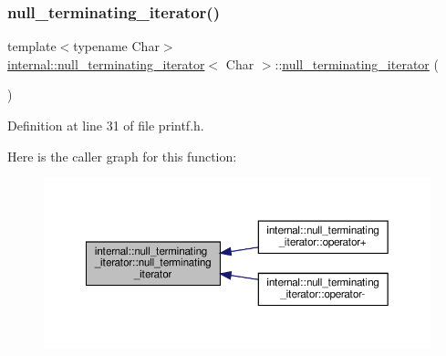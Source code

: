 \subsubsection{\texorpdfstring{null\+\_\+terminating\+\_\+iterator()}{null\_terminating\_iterator()}\hspace{0.1cm}{\footnotesize\ttfamily [1/3]}}
{\footnotesize\ttfamily template$<$typename Char$>$ \\
\hyperlink{classinternal_1_1null__terminating__iterator}{internal\+::null\+\_\+terminating\+\_\+iterator}$<$ Char $>$\+::\hyperlink{classinternal_1_1null__terminating__iterator}{null\+\_\+terminating\+\_\+iterator} (\begin{DoxyParamCaption}{ }\end{DoxyParamCaption})\hspace{0.3cm}{\ttfamily [inline]}}



Definition at line 31 of file printf.\+h.

Here is the caller graph for this function\+:
\nopagebreak
\begin{figure}[H]
\begin{center}
\leavevmode
\includegraphics[width=350pt]{classinternal_1_1null__terminating__iterator_a2c85bbc62dfa178fbe579df6933a70c4_icgraph}
\end{center}
\end{figure}
\mbox{\label{classinternal_1_1null__terminating__iterator_ab425ad7f2b63584fe73ceb38535f434c}} 

